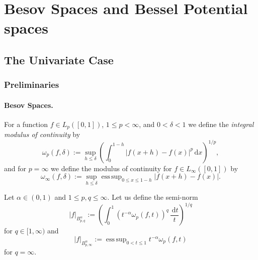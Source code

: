 \documentclass[12pt]{article}
\newcommand{\rd}{\,\mathrm{d}}
\newcommand{\esssup}{\mathop{\mathrm{ess\,sup}}}
\begin{document}

\section{Besov Spaces and Bessel Potential spaces}
\label{Sec:Besov}



\subsection{The Univariate Case}
\label{Subsec:Besov_Univ}



\subsubsection{Preliminaries}


\paragraph{Besov Spaces.}

For a function $f \in L_p([0,1])$, $1\le p <
\infty$, and $0 < \delta < 1$ we define the \emph{integral modulus of
continuity} by
\begin{equation*}
\omega_p(f,\delta) :=  \sup_{h \le \delta} \left(\int_0^{1-h}
|f(x+h)-f(x)|^p \rd x \right)^{1/p},
\end{equation*}
and for $p = \infty$ we define the modulus of continuity for $f \in
L_\infty([0,1])$ by
\begin{equation*}
\omega_\infty(f,\delta) := \sup_{h \le \delta}  \esssup_{0 \le
x \le 1-h} |f(x+h)-f(x)|.
\end{equation*}

Let $\alpha\in (0,1)$ and $1 \le p, q \le \infty$.
Let us define the semi-norm
\begin{equation*}
|f|_{B^\alpha_{p,q}} :=  \left(\int_0^1 (t^{-\alpha} \omega_p(f,t))^q
\,\frac{\rd t}{t} \right)^{1/q}
\end{equation*}
for $q\in [1,\infty)$ and
\begin{equation*}
|f|_{B^\alpha_{p,\infty}} :=  \esssup_{0<t\le 1} t^{-\alpha}
\omega_p(f,t)
\end{equation*}
for $q=\infty$.
\end{document}
